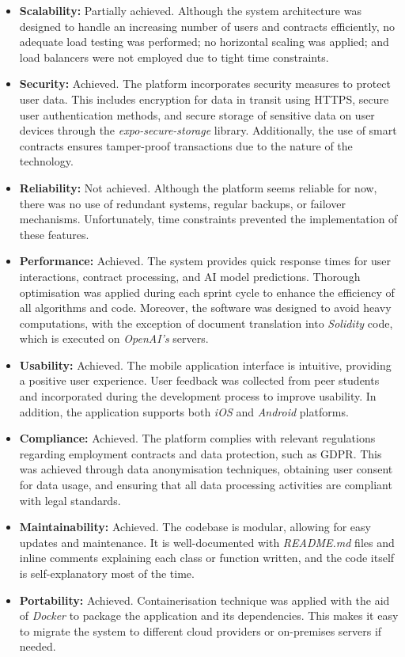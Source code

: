 \begin{itemize}
    \item \textbf{Scalability:} Partially achieved. Although the system architecture was designed to handle an increasing number of users and contracts efficiently, no adequate load testing was performed; no horizontal scaling was applied; and load balancers were not employed due to tight time constraints.
    \item \textbf{Security:} Achieved. The platform incorporates security measures to protect user data. This includes encryption for data in transit using HTTPS, secure user authentication methods, and secure storage of sensitive data on user devices through the \textit{expo-secure-storage} library. Additionally, the use of smart contracts ensures tamper-proof transactions due to the nature of the technology.
    \item \textbf{Reliability:} Not achieved. Although the platform seems reliable for now, there was no use of redundant systems, regular backups, or failover mechanisms. Unfortunately, time constraints prevented the implementation of these features.
    \item \textbf{Performance:} Achieved. The system provides quick response times for user interactions, contract processing, and AI model predictions. Thorough optimisation was applied during each sprint cycle to enhance the efficiency of all algorithms and code. Moreover, the software was designed to avoid heavy computations, with the exception of document translation into \textit{Solidity} code, which is executed on \textit{OpenAI's} servers.
    \item \textbf{Usability:} Achieved. The mobile application interface is intuitive, providing a positive user experience. User feedback was collected from peer students and incorporated during the development process to improve usability. In addition, the application supports both \textit{iOS} and \textit{Android} platforms.
    \item \textbf{Compliance:} Achieved. The platform complies with relevant regulations regarding employment contracts and data protection, such as GDPR. This was achieved through data anonymisation techniques, obtaining user consent for data usage, and ensuring that all data processing activities are compliant with legal standards.
    \item \textbf{Maintainability:} Achieved. The codebase is modular, allowing for easy updates and maintenance. It is well-documented with \textit{README.md} files and inline comments explaining each class or function written, and the code itself is self-explanatory most of the time.
    \item \textbf{Portability:} Achieved. Containerisation technique was applied with the aid of \textit{Docker} to package the application and its dependencies. This makes it easy to migrate the system to different cloud providers or on-premises servers if needed.
\end{itemize}

